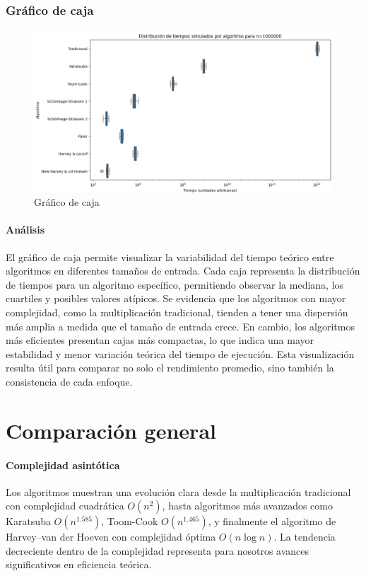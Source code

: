 \clearpage

\subsubsection{Gráfico de caja}

\begin{figure}[!ht]
    \centering
    \includegraphics[scale=0.6]{figures/graficocajas.png}
    \caption{Gráfico de caja}
    \label{fig:chart_a}
\end{figure}

\paragraph{Análisis}
El gráfico de caja permite visualizar la variabilidad del tiempo teórico entre algoritmos en diferentes tamaños de entrada. Cada caja representa la distribución de tiempos para un algoritmo específico, permitiendo observar la mediana, los cuartiles y posibles valores atípicos. Se evidencia que los algoritmos con mayor complejidad, como la multiplicación tradicional, tienden a tener una dispersión más amplia a medida que el tamaño de entrada crece. En cambio, los algoritmos más eficientes presentan cajas más compactas, lo que indica una mayor estabilidad y menor variación teórica del tiempo de ejecución. Esta visualización resulta útil para comparar no solo el rendimiento promedio, sino también la consistencia de cada enfoque.
\clearpage

\section{Comparación general}

\paragraph{Complejidad asintótica} 
Los algoritmos muestran una evolución clara desde la multiplicación tradicional con complejidad cuadrática \( O(n^2) \), hasta algoritmos más avanzados como Karatsuba \( O(n^{1.585}) \), Toom-Cook \( O(n^{1.465}) \), y finalmente el algoritmo de Harvey–van der Hoeven con complejidad óptima \( O(n \log n) \). La tendencia decreciente dentro de la complejidad representa para nosotros avances significativos en eficiencia teórica.

